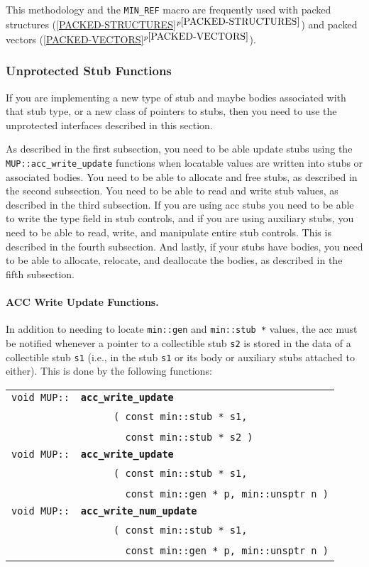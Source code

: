 \documentclass[12pt]{article}
\makeatletter
\newcommand{\subsubsubsection}[1]{\paragraph[#1]{#1.}}
\newcommand{\ttindex}[1]{\index{#1@{\tt #1}}}
\newcommand{\MUPindex}[1]{\ttindex{MUP::#1}\ttindex{#1}}
\newcommand{\itemref}[1]{\ref{#1}$^{p\pageref{#1}}$}
\newcommand{\EOL}{\penalty \exhyphenpenalty}
\newenvironment{indpar}[1][0.3in]%
	{\begin{list}{}%
		     {\setlength{\itemsep}{0in}%
		      \setlength{\topsep}{0in}%
		      \setlength{\parsep}{1ex}%
		      \setlength{\labelwidth}{#1}%
		      \setlength{\leftmargin}{#1}%
		      \addtolength{\leftmargin}{\labelsep}}%
	 \item}%
	{\end{list}}
\newcommand{\LABEL}[1]{\label{#1}}
\newcommand{\ARGBREAK}{\\&{\tt ~~~~}}
\newcommand{\MUPKEY}[1]{{\tt \bf #1}\MUPindex{#1}}
\makeatother
\begin{document}
This methodology and the {\tt MIN\_\EOL REF} macro are frequently
used with packed structures (\itemref{PACKED-STRUCTURES}) and
packed vectors (\itemref{PACKED-VECTORS}).

\subsubsection{Unprotected Stub Functions}
\label{UNPROTECTED-STUB-FUNCTIONS}

If you are implementing a new type of stub and maybe bodies
associated with that stub type, or a new class of pointers to stubs,
then you need to use the unprotected
interfaces described in this section.

As described in the first subsection, you need to be able update stubs
using the {\tt MUP::\EOL acc\_\EOL write\_\EOL update} functions
when locatable values are written into stubs or associated bodies.
You need to be able to allocate and free stubs, as described in the
second subsection.  You need to be able to read and write stub values,
as described in the third subsection.  If you are using acc stubs you
need to be able to write the type field in stub controls, and if
you are using auxiliary stubs, you need to be able to read, write,
and manipulate entire stub controls.
This is described in the fourth subsection.
And lastly, if your stubs have bodies, you need to be able to allocate,
relocate, and deallocate the bodies, as described in the fifth
subsection.

\subsubsubsection{ACC Write Update Functions}
\label{ACC-WRITE-UPDATE-FUNCTIONS}

In addition to needing to locate \verb|min::gen|
and {\tt min::\EOL stub~*} values, the acc
must be notified whenever a pointer to a collectible stub \verb|s2|
is stored in the data of a collectible stub \verb|s1| (i.e., in
the stub \verb|s1| or its body or auxiliary stubs attached to either).
This is done by the following functions:

\begin{indpar}\begin{tabular}{r@{}l}
\verb|void MUP::|
    & \MUPKEY{acc\_write\_update}\ARGBREAK
          \verb| ( const min::stub * s1,|\ARGBREAK
	  \verb|   const min::stub * s2 )|
\LABEL{MUP::ACC_WRITE_STUB_UPDATE} \\
\verb|void MUP::|
    & \MUPKEY{acc\_write\_update}\ARGBREAK
	  \verb| ( const min::stub * s1,|\ARGBREAK
	  \verb|   const min::gen * p, min::unsptr n )|
\LABEL{MUP::ACC_WRITE_GEN_UPDATE} \\
\verb|void MUP::|
    & \MUPKEY{acc\_write\_num\_update}\ARGBREAK
	  \verb| ( const min::stub * s1,|\ARGBREAK
	  \verb|   const min::gen * p, min::unsptr n )|
\LABEL{MUP::ACC_WRITE_NUM_UPDATE} \\
\end{tabular}\end{indpar}
\end{document}
